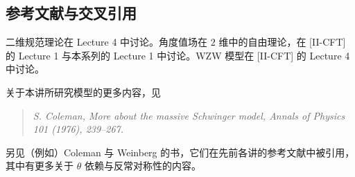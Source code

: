 \subsection*{参考文献与交叉引用}

二维规范理论在 Lecture 4 中讨论。角度值场在 $2$ 维中的自由理论，在 [II-CFT] 的 Lecture 1 与本系列的 Lecture 1 中讨论。WZW 模型在 [II-CFT] 的 Lecture 4 中讨论。

关于本讲所研究模型的更多内容，见

\begin{quote}
\textit{S. Coleman, More about the massive Schwinger model, Annals of Physics 101 (1976), 239--267.}
\end{quote}

另见（例如）Coleman 与 Weinberg 的书，它们在先前各讲的参考文献中被引用，其中有更多关于 $\theta$ 依赖与反常对称性的内容。
